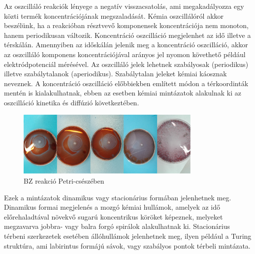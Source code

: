 Az oszcilláló reakciók lényege a negatív visszacsatolás, ami megakadályozza egy közti termék koncentrációjának megszaladását.
Kémia oszcillálóról akkor beszélünk, ha a reakcióban résztvevő komponensek koncentrációja nem monoton, hanem periodikusan változik. Koncentráció oszcilláció megjelenhet az idő illetve a térskálán. Amennyiben az időskálán jelenik meg a koncentráció oszcilláció, akkor az oszcilláló komponens koncentrációjával arányos jel nyomon követhető például elektródpotenciál mérésével.
Az oszcilláló jelek lehetnek szabályosak (periodikus) illetve szabálytalanok (aperiodikus). Szabálytalan jeleket kémiai káosznak neveznek. A koncentráció oszcilláció előbbiekben említett módon a térkoordinták mentén is kialakulhatnak, ebben az esetben kémiai mintázatok alakulnak ki az oszcilláció kinetika és diffúzió következtében.\\
\begin{figure}[h]
\centering
\includegraphics[width=0.8\textwidth]{img/oscillating_reaction.jpg}
\caption{BZ reakció Petri-csészében}
\label{fig:ionophores}
\end{figure}
Ezek a mintázatok dinamikus vagy stacionárius formában jelenhetnek meg.
Dinamikus formai megjelenés a mozgó kémiai hullámok, amelyek az idő előrehaladtával növekvő sugarú koncentrikus köröket képeznek, melyeket megzavarva jobbra- vagy balra forgó spirálok alakulhatnak ki.
Stacionárius térbeni szerkezetek esetében állóhullámok jelenhetnek meg, ilyen például a Turing struktúra, ami labirintus formájú sávok, vagy szabályos pontok térbeli mintázata.

